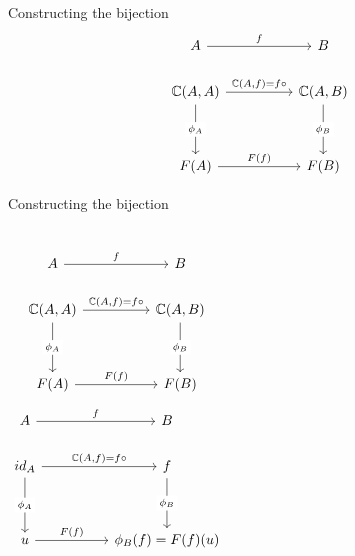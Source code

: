 \begin{frame}[fragile]{Constructing the bijection}
		\[\begin{tikzcd}
			A && B \\
			{\bC(A,A)} && {\bC(A,B)} \\
			\\
			{F(A)} && {F(B)}
			\arrow["f", from=1-1, to=1-3]
			\arrow["{\bC(A,f) = f \circ}", from=2-1, to=2-3]
			\arrow["{\phi_A}"{description}, from=2-1, to=4-1]
			\arrow["{\phi_B}"{description}, from=2-3, to=4-3]
			\arrow["{F(f)}", from=4-1, to=4-3]
		\end{tikzcd}\]
		\iffalse
		\column{0.7\textwidth}
		\begin{itemize}
			\item Let $\phi \in \text{Nat}(\bC(A,-), F)$. Since $\phi$ is natural transformation, we have
			\[F(f) \circ \phi_A = \phi_B \circ f \circ\]
			\pause\item Remember that these functors are $\bC \to \bS et$.
			\pause\item This means our morphisms are just regular set functions.
		\end{itemize}
	\fi
\end{frame}

\begin{frame}[fragile]{Constructing the bijection}
	\begin{columns}
		\[\begin{tikzcd}
			A && B \\
			{\bC(A,A)} && {\bC(A,B)} \\
			\\
			{F(A)} && {F(B)}
			\arrow["f", from=1-1, to=1-3]
			\arrow["{\bC(A,f) = f \circ}", from=2-1, to=2-3]
			\arrow["{\phi_A}"{description}, from=2-1, to=4-1]
			\arrow["{\phi_B}"{description}, from=2-3, to=4-3]
			\arrow["{F(f)}", from=4-1, to=4-3]
		\end{tikzcd}\]
		\[\begin{tikzcd}
			A && B \\
			{id_A} && {f} \\
			\\
			{u} && {\phi_B(f) = F(f)(u)}
			\arrow["f", from=1-1, to=1-3]
			\arrow["{\bC(A,f) = f \circ}", from=2-1, to=2-3]
			\arrow["{\phi_A}"{description}, from=2-1, to=4-1]
			\arrow["{\phi_B}"{description}, from=2-3, to=4-3]
			\arrow["{F(f)}", from=4-1, to=4-3]
		\end{tikzcd}\]
	\end{columns}
\end{frame}
